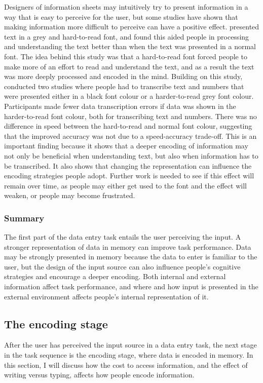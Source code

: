 Designers of information sheets may intuitively try to present information in a way that is easy to perceive for the user, but some studies have shown that making information more difficult to perceive can have a positive effect.
\citet{Diemand-Yauman2011} presented text in a grey and hard-to-read font, and found this aided people in processing and understanding the text better than when the text was presented in a normal font. The idea behind this study was that a hard-to-read font forced people to make more of an effort to read and understand the text, and as a result the text was more deeply processed and encoded in the mind. Building on this study, \citet{Soboczenski2013} conducted two studies where people had to transcribe text and numbers that were presented either in a black font colour or a harder-to-read grey font colour. Participants made fewer data transcription errors if data was shown in the harder-to-read font colour, both for transcribing text and numbers. There was no difference in speed between the hard-to-read and normal font colour, suggesting that the improved accuracy was not due to a speed-accuracy trade-off. This is an important finding because it shows that a deeper encoding of information may not only be beneficial when understanding text, but also when information has to be transcribed. It also shows that changing the representation can influence the encoding strategies people adopt.
Further work is needed to see if this effect will remain over time, as people may either get used to the font and the effect will weaken, or people may become frustrated. 

\subsubsection{Summary}
The first part of the data entry task entails the user perceiving the input.  A stronger representation of data in memory can improve task performance. Data may be strongly presented in memory because the data to enter is familiar to the user, but the design of the input source can also influence people's cognitive strategies and encourage a deeper encoding. Both internal and external information affect task performance, and where and how input is presented in the external environment affects people's internal representation of it. 

\subsection{The encoding stage}\label{sec:Encoding_stage}
After the user has perceived the input source in a data entry task, the next stage in the task sequence is the encoding stage, where data is encoded in memory. In this section, I will discuss how the cost to access information, and the effect of writing versus typing, affects how people encode information.

